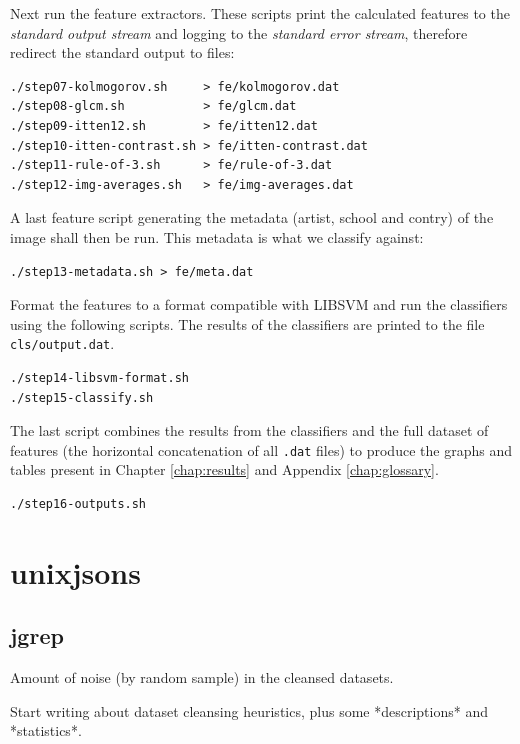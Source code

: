 \documentclass[11pt,a4paper,draft]{report}
\begin{document}
Next run the feature extractors.  These scripts print the calculated features
to the \emph{standard output stream} and logging to the \emph{standard error
stream}, therefore redirect the standard output to files:

\begin{Verbatim}[frame=leftline]
./step07-kolmogorov.sh     > fe/kolmogorov.dat
./step08-glcm.sh           > fe/glcm.dat
./step09-itten12.sh        > fe/itten12.dat
./step10-itten-contrast.sh > fe/itten-contrast.dat
./step11-rule-of-3.sh      > fe/rule-of-3.dat
./step12-img-averages.sh   > fe/img-averages.dat
\end{Verbatim}

A last feature script generating the metadata (artist, school and contry) of
the image shall then be run.  This metadata is what we classify against:

\begin{Verbatim}[frame=leftline]
./step13-metadata.sh > fe/meta.dat
\end{Verbatim}

Format the features to a format compatible with LIBSVM and run the classifiers
using the following scripts.  The results of the classifiers are printed to the
file \texttt{cls/output.dat}.

\begin{Verbatim}[frame=leftline]
./step14-libsvm-format.sh
./step15-classify.sh
\end{Verbatim}

The last script combines the results from the classifiers and the full dataset
of features (the horizontal concatenation of all \texttt{.dat} files) to
produce the graphs and tables present in Chapter \ref{chap:results} and
Appendix \ref{chap:glossary}.

\begin{Verbatim}[frame=leftline]
./step16-outputs.sh
\end{Verbatim}

\chapter{unixjsons}
\label{chap:unixjsons}

\section{jgrep}

Amount of noise (by random sample) in the cleansed datasets.

Start writing about dataset cleansing heuristics, plus some *descriptions* and
*statistics*.
\end{document}
